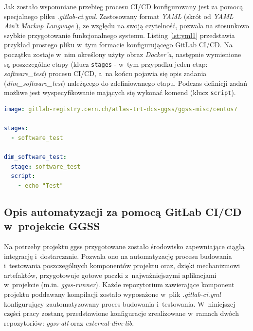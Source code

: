Jak zostało wspomniane przebieg procesu CI/CD konfigurowany jest za pomocą specjalnego pliku \textit{.gitlab-ci.yml}. Zastosowany format \textit{YAML} (skrót od \textit{YAML Ain't Markup Language} \cite{YAMLWiki}), ze względu na swoją czytelność, pozwala na stosunkowo szybkie przygotowanie funkcjonalnego systemu. Listing \ref{lst:yml1} przedstawia przykład prostego pliku w~tym formacie konfigurującego GitLab CI/CD. Na początku zostaje w~nim określony użyty obraz \textit{Docker'a}, następnie wymienione są poszczególne etapy (klucz \lstinline{stages} - w~tym przypadku jeden etap: \textit{software\_test}) procesu CI/CD, a~na końcu pojawia się opis zadania (\textit{dim\_software\_test}) należącego do zdefiniowanego etapu. Podczas definicji zadań możliwe jest wyspecyfikowanie mających się wykonać komend (klucz \lstinline{script}).

\begin{lstlisting}[language=yaml, caption={Przykład prostego pliku \textit{.gitlab-ci.yml} generującego jeden etap procesu CI/CD oraz jedno zadanie w~ramach tego etapu}, label={lst:yml1}]
image: gitlab-registry.cern.ch/atlas-trt-dcs-ggss/ggss-misc/centos7

stages:
  - software_test

dim_software_test:
  stage: software_test
  script:
    - echo "Test"

\end{lstlisting}

\subsection{Opis automatyzacji za pomocą GitLab CI/CD w~projekcie GGSS}
Na potrzeby projektu \gls*{ggss} przygotowane zostało środowisko zapewniające ciągłą integrację i~dostarczanie. Pozwala ono na automatyzację procesu budowania i~testowania poszczególnych komponentów projektu oraz, dzięki mechanizmowi artefaktów, przygotowuje gotowe paczki z~najważniejszymi aplikacjami w~projekcie (m.in. \textit{ggss-runner}). Każde repozytorium zawierające komponent projektu poddawany kompilacji zostało wyposażone w~plik \textit{.gitlab-ci.yml} konfigurujący zautomatyzowany proces budowania i~testowania. W~niniejszej części pracy zostaną przedstawione konfiguracje zrealizowane w~ramach dwóch repozytoriów: \textit{ggss-all} oraz \textit{external-dim-lib}. 

